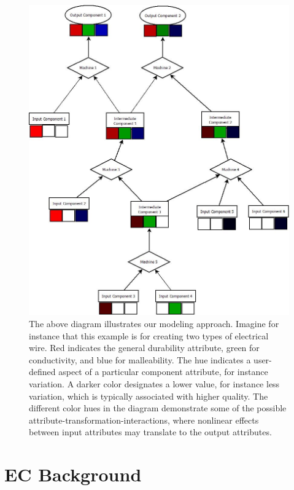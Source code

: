 \documentclass{IEEEtran}
\begin{document}
\begin{figure}[!t]
\centerline{\includegraphics[width=\columnwidth]{Diagram1.jpeg}}
\caption{The above diagram illustrates our modeling approach. Imagine for instance that this example is for creating two types of electrical wire. Red indicates the general durability attribute, green for conductivity, and blue for malleability. The hue indicates a user-defined aspect of a particular component attribute, for instance variation. A darker color designates a lower value, for instance less variation, which is typically associated with higher quality. The different color hues in the diagram demonstrate some of the possible attribute-transformation-interactions, where nonlinear effects between input attributes may translate to the output attributes.}
\label{fig1}
\end{figure}

\section{EC Background}
\end{document}
